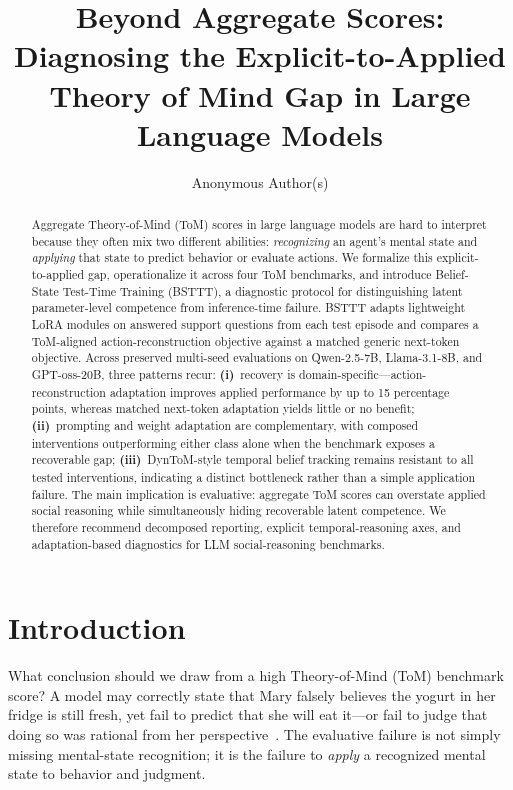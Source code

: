 \documentclass{article}
\title{Beyond Aggregate Scores: Diagnosing the Explicit-to-Applied\\Theory of Mind Gap in Large Language Models}
\author{
  Anonymous Author(s)
}
\begin{document}
\maketitle

\begin{abstract}
Aggregate Theory-of-Mind (ToM) scores in large language models are hard to interpret because they often mix two different abilities: \emph{recognizing} an agent's mental state and \emph{applying} that state to predict behavior or evaluate actions.
We formalize this explicit-to-applied gap, operationalize it across four ToM benchmarks, and introduce Belief-State Test-Time Training (BSTTT), a diagnostic protocol for distinguishing latent parameter-level competence from inference-time failure.
BSTTT adapts lightweight LoRA modules on answered support questions from each test episode and compares a ToM-aligned action-reconstruction objective against a matched generic next-token objective.
Across preserved multi-seed evaluations on Qwen-2.5-7B, Llama-3.1-8B, and GPT-oss-20B, three patterns recur:
\textbf{(i)}~recovery is domain-specific---action-reconstruction adaptation improves applied performance by up to 15 percentage points, whereas matched next-token adaptation yields little or no benefit;
\textbf{(ii)}~prompting and weight adaptation are complementary, with composed interventions outperforming either class alone when the benchmark exposes a recoverable gap;
\textbf{(iii)}~DynToM-style temporal belief tracking remains resistant to all tested interventions, indicating a distinct bottleneck rather than a simple application failure.
The main implication is evaluative: aggregate ToM scores can overstate applied social reasoning while simultaneously hiding recoverable latent competence.
We therefore recommend decomposed reporting, explicit temporal-reasoning axes, and adaptation-based diagnostics for LLM social-reasoning benchmarks.
\end{abstract}


\section{Introduction}
\label{sec:intro}

What conclusion should we draw from a high Theory-of-Mind (ToM) benchmark score?
A model may correctly state that Mary falsely believes the yogurt in her fridge is still fresh, yet fail to predict that she will eat it---or fail to judge that doing so was rational from her perspective~\citep{gu2024simpletom}.
The evaluative failure is not simply missing mental-state recognition; it is the failure to \emph{apply} a recognized mental state to behavior and judgment.
\end{document}
